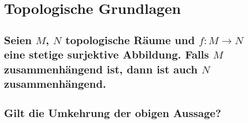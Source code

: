\setcounter{topGrd}{2}
\section{Topologische Grundlagen }
\subsection{Seien $M$, $N$ topologische Räume und $f:M\to N$ eine stetige surjektive Abbildung. Falls $M$ zusammenhängend ist, dann ist auch $N$ zusammenhängend.}


\subsection{Gilt die Umkehrung der obigen Aussage?}



